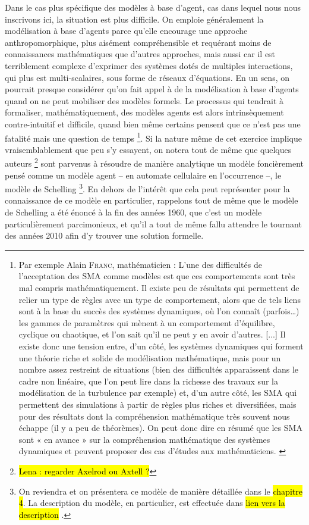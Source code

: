 Dans le cas plus spécifique des modèles à base d'agent, cas dans lequel nous nous inscrivons ici, la situation est plus difficile.
On emploie généralement la modélisation à base d'agents parce qu'elle encourage une approche anthropomorphique, plus aisément compréhensible et requérant moins de connaissances mathématiques que d'autres approches, mais aussi car il est terriblement complexe d'exprimer des systèmes dotés de multiples interactions, qui plus est multi-scalaires, sous forme de réseaux d'équations.
En un sens, on pourrait presque considérer qu'on fait appel à de la modélisation à base d'agents quand on ne peut mobiliser des modèles formels.
Le processus qui tendrait à formaliser, mathématiquement, des modèles agents est alors intrinsèquement contre-intuitif et difficile, quand bien même certains pensent que ce n'est pas une fatalité mais une question de temps
\footnote{
Par exemple Alain \textsc{Franc}, mathématicien : \og L’une des difficultés de l’acceptation des SMA comme modèles est que ces comportements sont très mal compris mathématiquement. Il existe peu de résultats qui permettent de relier un type de règles avec un type de comportement, alors que de tels liens sont à la base du succès des systèmes dynamiques, où l’on connaît (parfois\ldots) les gammes de paramètres qui mènent à un comportement d’équilibre, cyclique ou chaotique, et l’on sait qu’il ne peut y en avoir d’autres. [...] Il existe donc une tension entre, d’un côté, les systèmes dynamiques qui forment une théorie riche et solide de modélisation mathématique, mais pour un nombre assez restreint de situations (bien des difficultés apparaissent dans le cadre non linéaire, que l’on peut lire dans la richesse des travaux sur la modélisation de la turbulence par exemple) et, d’un autre côté, les SMA qui permettent des simulations à partir de règles plus riches et diversifiées, mais pour des résultats dont la compréhension mathématique très souvent nous échappe (il y a peu de théorèmes). On peut donc dire en résumé que les SMA sont « en avance » sur la compréhension mathématique des systèmes dynamiques et peuvent proposer des cas d’études aux mathématiciens.\fg{} \autocite[Annexe 2, \og Retour sur les SMA comme outil et cadre conceptuel de modélisation.\fg{}, pp. 479-482 ]{ouriachi_lelaboration_2018}
}.
Si la nature même de cet exercice implique vraisemblablement que peu s'y essayent, on notera tout de même que quelques auteurs \autocite{zhang_tipping_2011,grauwin_dynamic_2012}\footnote{\hl{Lena : regarder Axelrod ou Axtell ?}} sont parvenus à résoudre de manière analytique un modèle foncièrement pensé comme un modèle agent -- en automate cellulaire en l'occurrence --, le modèle de Schelling
\footnote{
	On reviendra et on présentera ce modèle de manière détaillée dans le \hl{chapitre 4}.
	La description du modèle, en particulier, est effectuée dans \hl{lien vers la description} %
.}.
En dehors de l'intérêt que cela peut représenter pour la connaissance de ce modèle en particulier, rappelons tout de même que le modèle de Schelling a été énoncé à la fin des années 1960, que c'est un modèle particulièrement parcimonieux, et qu'il a tout de même fallu attendre le tournant des années 2010 afin d'y trouver une solution formelle.

